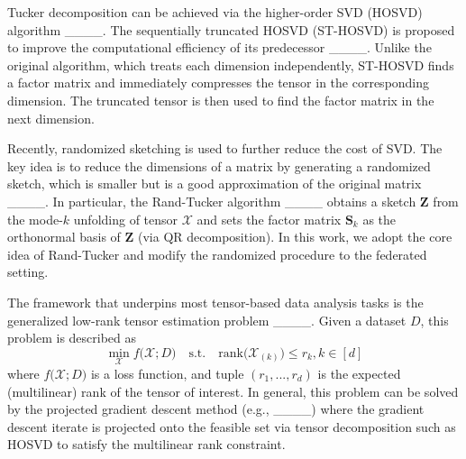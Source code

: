 Tucker decomposition can be achieved via the higher-order SVD (HOSVD) algorithm ____. The sequentially truncated HOSVD (ST-HOSVD) is proposed to improve the computational efficiency of its predecessor ____. Unlike the original algorithm, which treats each dimension independently, ST-HOSVD finds a factor matrix and immediately compresses the tensor in the corresponding dimension. The truncated tensor is then used to find the factor matrix in the next dimension.

Recently, randomized sketching is used to further reduce the cost of SVD. The key idea is to reduce the dimensions of a matrix by generating a randomized sketch, which is smaller but is a good approximation of the original matrix ____. In particular, the Rand-Tucker algorithm ____ obtains a sketch 
$\mathbf{Z}$ from the mode-$k$ unfolding of tensor $\boldsymbol{\mathcal{X}}$ and sets the factor matrix $\mathbf{S}_k$  as the orthonormal basis of $\mathbf{Z}$ (via QR decomposition). In this work, we adopt the core idea of Rand-Tucker and modify the randomized procedure to the federated setting.

The framework that underpins most tensor-based data analysis tasks is the generalized low-rank tensor estimation problem ____. Given a dataset $\mathit{D}$, this problem is described as
\begin{equation}\label{eq:estimation}
    \min_{\boldsymbol{\mathcal{X}}} f\big(\boldsymbol{\mathcal{X}}; \mathit{D}\big) \quad
    \text{s.t.} \quad \text{rank}\big(\boldsymbol{\mathcal{X}}_{(k)}\big) \leq r_k, k\in[d]
\end{equation}
where $f\big(\boldsymbol{\mathcal{X}}; \mathit{D}\big)$ is a loss function, and tuple $(r_1, ..., r_d)$ is the expected (multilinear) rank of the tensor of interest. 
In general, this problem can be solved by the projected gradient descent method (e.g., ____) where the gradient descent iterate is projected onto the feasible set via tensor decomposition such as HOSVD to satisfy the multilinear rank constraint. 

